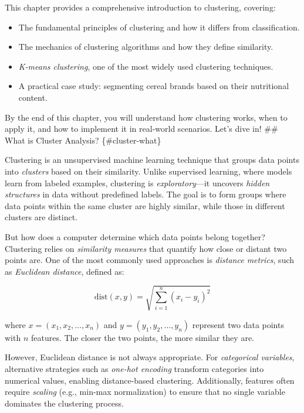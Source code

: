 \documentclass[
]{book}
\providecommand{\tightlist}{%
  \setlength{\itemsep}{0pt}\setlength{\parskip}{0pt}}
\theoremstyle{definition}
\theoremstyle{definition}
\theoremstyle{definition}
\theoremstyle{definition}
\theoremstyle{remark}
\begin{document}
This chapter provides a comprehensive introduction to clustering, covering:

\begin{itemize}
\tightlist
\item
  The fundamental principles of clustering and how it differs from classification.\\
\item
  The mechanics of clustering algorithms and how they define similarity.\\
\item
  \emph{K-means clustering}, one of the most widely used clustering techniques.\\
\item
  A practical case study: segmenting cereal brands based on their nutritional content.
\end{itemize}

By the end of this chapter, you will understand how clustering works, when to apply it, and how to implement it in real-world scenarios. Let's dive in!
\#\# What is Cluster Analysis? \{\#cluster-what\}

Clustering is an unsupervised machine learning technique that groups data points into \emph{clusters} based on their similarity. Unlike supervised learning, where models learn from labeled examples, clustering is \emph{exploratory}---it uncovers \emph{hidden structures} in data without predefined labels. The goal is to form groups where data points within the same cluster are highly similar, while those in different clusters are distinct.

But how does a computer determine which data points belong together? Clustering relies on \emph{similarity measures} that quantify how close or distant two points are. One of the most commonly used approaches is \emph{distance metrics}, such as \emph{Euclidean distance}, defined as:

\[
\text{dist}(x, y) = \sqrt{ \sum_{i=1}^n (x_i - y_i)^2}
\]

where \(x = (x_1, x_2, \ldots, x_n)\) and \(y = (y_1, y_2, \ldots, y_n)\) represent two data points with \(n\) features. The closer the two points, the more similar they are.

However, Euclidean distance is not always appropriate. For \emph{categorical variables}, alternative strategies such as \emph{one-hot encoding} transform categories into numerical values, enabling distance-based clustering. Additionally, features often require \emph{scaling} (e.g., min-max normalization) to ensure that no single variable dominates the clustering process.
\end{document}
